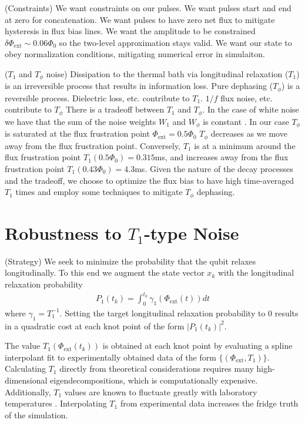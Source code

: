 \documentclass[
  amsfonts,
  amsmath,
  tbtags,
  amssymb,
  aps,
  nobibnotes,
  prl,
  twocolumn,
]{revtex4-2}
\begin{document}
(Constraints) We want constraints on our pulses. We want pulses start and end at zero
for concatenation. We want pulses to have zero net flux to mitigate
hysteresis in flux bias lines.
We want the amplitude to be constrained
$\delta \Phi_{\textrm{ext}} \sim 0.06 \Phi_{0}$
so the two-level approximation stays valid.
We want our state to obey normalization conditions,
mitigating numerical error in simulaiton.

($T_{1}$ and $T_{\phi}$ noise)
Dissipation to the thermal bath via longitudinal
relaxation ($T_{1}$) is an irreversible process
that results in information loss.
Pure dephasing ($T_{\phi}$) is a reversible process.
Dielectric loss, etc. contribute
to $T_{1}$. $1/f$ flux noise, etc. contribute to $T_{\phi}$
There is a tradeoff between $T_{1}$ and $T_{\phi}$. In the case of white
noise we have that the sum of the noise weights $W_{1}$ and $W_{\phi}$
is constant \cite{huang2020engineering}.
In our case $T_{\phi}$ is saturated at the flux
frustration point $\Phi_{\textrm{ext}} = 0.5 \Phi_{0}$
$T_{\phi}$ decreases as we move away from the flux
frustration point. Conversely, $T_{1}$ is at a minimum
around the flux frustration point $T_{1}(0.5 \Phi_{0}) = 0.315$ms,
and increases away from the flux frustration point
$T_{1}(0.43 \Phi_{0}) = 4.3$ms. Given the nature
of the decay processes and the tradeoff, we choose
to optimize the flux bias to have high time-averaged
$T_{1}$ times and employ some techniques to mitigate
$T_{\phi}$ dephasing.


\section{Robustness to $T_{1}$-type Noise}
(Strategy) We seek to minimize the probability
that the qubit relaxes longitudinally.
To this end we augment the state vector $x_{k}$ with the
longitudinal relaxation probability
\begin{align}
  P_{1}(t_{k}) = \int_{0}^{t_{k}}
  \gamma_{1}(\Phi_{\textrm{ext}}(t)) dt
\end{align}
where $\gamma_{1} = T_{1}^{-1}$. Setting the target
longitudinal relaxation probability to 0 results in
a quadratic cost at each knot point
of the form ${\lvert P_{1}(t_{k}) \rvert}^{2}$.

The value $T_{1}(\Phi_{\textrm{ext}}(t_{k}))$
is obtained at each knot point by evaluating
a spline interpolant fit to
experimentally obtained data of the form
$\{(\Phi_{\textrm{ext}}, T_{1})\}$.
Calculating $T_{1}$ directly from theoretical
considerations requires many high-dimensional
eigendecompositions, which
is computationally expensive. Additionally,
$T_{1}$ values are known to fluctuate greatly
with laboratory temperatures \cite{klimov2018fluctuations}.
Interpolating $T_{1}$ from experimental data increases
the fridge truth of the simulation.
\end{document}
